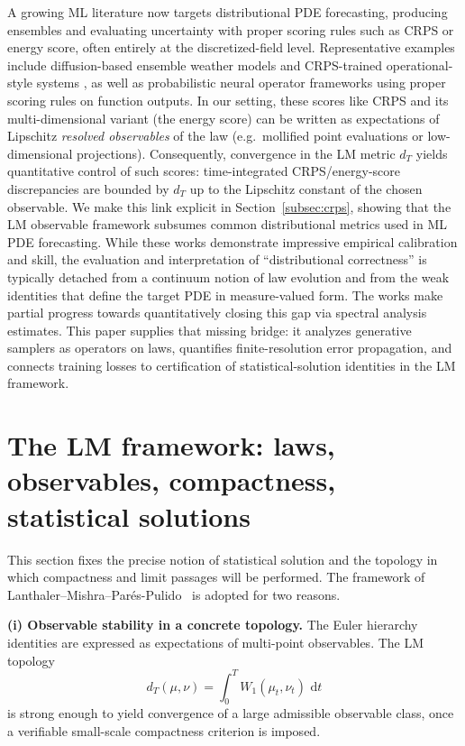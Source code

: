 \documentclass{article}
\numberwithin{equation}{section}
\theoremstyle{plain}
\theoremstyle{definition}
\theoremstyle{remark}
\newcommand{\dd}{\,\mathrm{d}}
\begin{document}
A growing ML literature now targets distributional PDE forecasting, producing ensembles and evaluating uncertainty with proper scoring rules such as CRPS or energy score, often entirely at the discretized-field level. Representative examples include diffusion-based ensemble weather models \cite{price2023gencast, bulte2025probabilistic, price2025probabilistic, larsson2025diffusion, molinaro2024generative, armegioiu2025rectified} and CRPS-trained operational-style systems \cite{lang2026aifs}, as well as probabilistic neural operator frameworks using proper scoring rules on function outputs. In our setting,
these scores like CRPS and its multi-dimensional variant (the energy score) can be written as expectations of Lipschitz \emph{resolved observables} of the law (e.g.\ mollified point
evaluations or low-dimensional projections). Consequently, convergence in the LM metric $d_T$ yields quantitative control
of such scores: time-integrated CRPS/energy-score discrepancies are bounded by $d_T$ up to the Lipschitz constant of the
chosen observable. We make this link explicit in Section~\ref{subsec:crps}, showing that the LM observable framework
subsumes common distributional metrics used in ML PDE forecasting.
While these works demonstrate impressive empirical calibration and skill, the evaluation and interpretation of “distributional correctness” is typically detached from a continuum notion of law evolution and from the weak identities that define the target PDE in measure-valued form. The works \cite{molinaro2024generative, armegioiu2025rectified} make partial progress towards quantitatively closing this gap via spectral analysis estimates. This paper supplies that missing bridge: it analyzes generative samplers as operators on laws, quantifies finite-resolution error propagation, and connects training losses to certification of statistical-solution identities in the LM framework.

\section{The LM framework: laws, observables, compactness, statistical solutions}
\label{sec:LM}

This section fixes the precise notion of statistical solution and the topology in which compactness and limit passages
will be performed. The framework of Lanthaler--Mishra--Par\'es-Pulido~\cite{LMP2021} is adopted for two reasons.

\smallskip
\noindent\textbf{(i) Observable stability in a concrete topology.}
The Euler hierarchy identities are expressed as expectations of multi-point observables. The LM topology
\[
d_T(\mu,\nu)=\int_0^T W_1(\mu_t,\nu_t)\,\dd t
\]
is strong enough to yield convergence of a large admissible observable class, once a verifiable small-scale compactness
criterion is imposed.
\end{document}
